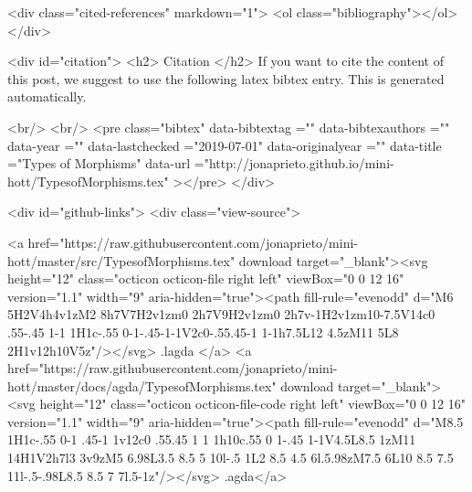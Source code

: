   <div class="cited-references" markdown="1">
  <ol class="bibliography"></ol>
  </div>


  
  <div id="citation">
  <h2> Citation </h2>
  If you want to cite the content of this post,
  we suggest to use the following latex bibtex entry.
  This is generated automatically.

  <br/>
  <br/>
  <pre class="bibtex"
       data-bibtextag =""
       data-bibtexauthors =""
       data-year =""
       data-lastchecked ="2019-07-01"
       data-originalyear =""
       data-title ="Types of Morphisms"
       data-url ="http://jonaprieto.github.io/mini-hott/TypesofMorphisms.tex"
  ></pre>
  </div>
  

  <div id="github-links">
    <div class="view-source">
      
        <a href="https://raw.githubusercontent.com/jonaprieto/mini-hott/master/src/TypesofMorphisms.tex" download target="_blank"><svg height="12" class="octicon octicon-file right left" viewBox="0 0 12 16" version="1.1" width="9" aria-hidden="true"><path fill-rule="evenodd" d="M6 5H2V4h4v1zM2 8h7V7H2v1zm0 2h7V9H2v1zm0 2h7v-1H2v1zm10-7.5V14c0 .55-.45 1-1 1H1c-.55 0-1-.45-1-1V2c0-.55.45-1 1-1h7.5L12 4.5zM11 5L8 2H1v12h10V5z"/></svg> .lagda </a>
        <a href="https://raw.githubusercontent.com/jonaprieto/mini-hott/master/docs/agda/TypesofMorphisms.tex" download target="_blank"><svg height="12" class="octicon octicon-file-code right left" viewBox="0 0 12 16" version="1.1" width="9" aria-hidden="true"><path fill-rule="evenodd" d="M8.5 1H1c-.55 0-1 .45-1 1v12c0 .55.45 1 1 1h10c.55 0 1-.45 1-1V4.5L8.5 1zM11 14H1V2h7l3 3v9zM5 6.98L3.5 8.5 5 10l-.5 1L2 8.5 4.5 6l.5.98zM7.5 6L10 8.5 7.5 11l-.5-.98L8.5 8.5 7 7l.5-1z"/></svg> .agda</a>
      
